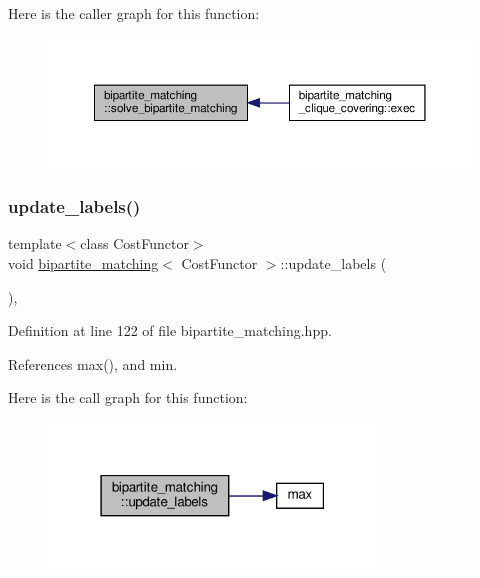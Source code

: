 Here is the caller graph for this function\+:
\nopagebreak
\begin{figure}[H]
\begin{center}
\leavevmode
\includegraphics[width=350pt]{dc/df0/classbipartite__matching_adaa99c992790423e6ecc95f8ac8bafe6_icgraph}
\end{center}
\end{figure}
\mbox{\label{classbipartite__matching_aa94d912ea3ad5f029cc94cb0495826a0}} 
\subsubsection{\texorpdfstring{update\+\_\+labels()}{update\_labels()}}
{\footnotesize\ttfamily template$<$class Cost\+Functor$>$ \\
void \hyperlink{classbipartite__matching}{bipartite\+\_\+matching}$<$ Cost\+Functor $>$\+::update\+\_\+labels (\begin{DoxyParamCaption}{ }\end{DoxyParamCaption})\hspace{0.3cm}{\ttfamily [inline]}, {\ttfamily [private]}}



Definition at line 122 of file bipartite\+\_\+matching.\+hpp.



References max(), and min.

Here is the call graph for this function\+:
\nopagebreak
\begin{figure}[H]
\begin{center}
\leavevmode
\includegraphics[width=247pt]{dc/df0/classbipartite__matching_aa94d912ea3ad5f029cc94cb0495826a0_cgraph}
\end{center}
\end{figure}


